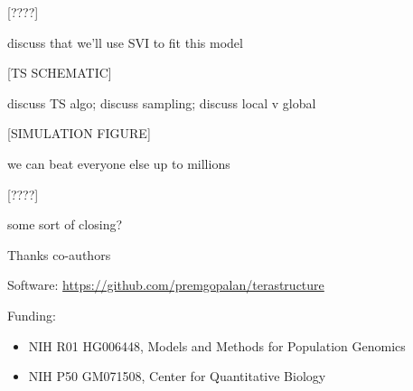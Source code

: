 \documentclass[serif,14pt]{beamer}
\begin{document}
\begin{frame}

[????]

discuss that we'll use SVI to fit this model
\end{frame}

\begin{frame}

[TS SCHEMATIC]

discuss TS algo; discuss sampling; discuss local v global
\end{frame}

\begin{frame}

[SIMULATION FIGURE]

we can beat everyone else up to millions
\end{frame}


\begin{frame}

[????]

some sort of closing?
\end{frame}

\begin{frame}
Thanks co-authors
\end{frame}

\begin{frame}
Software: \url{https://github.com/premgopalan/terastructure}

Funding:
\begin{itemize}
\item NIH R01 HG006448, Models and Methods for Population Genomics 
\item NIH P50 GM071508, Center for Quantitative Biology 
\end{itemize}
\end{frame}
\end{document}
